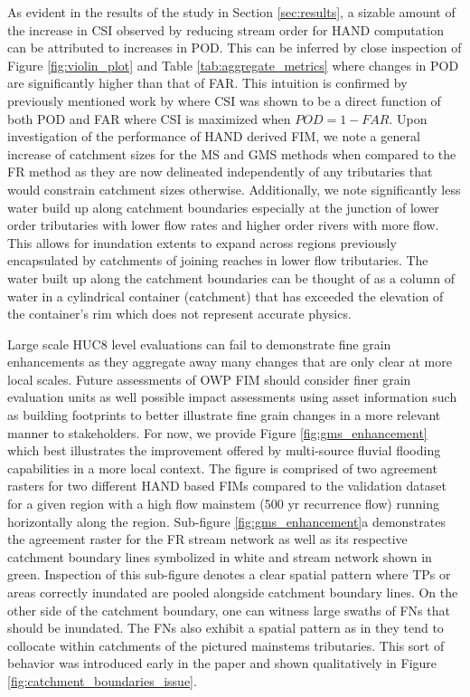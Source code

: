 \documentclass[draft]{dependencies/agujournal2019}
\begin{document}
As evident in the results of the study in Section \ref{sec:results}, a sizable amount of the increase in CSI observed by reducing stream order for HAND computation can be attributed to increases in POD.
This can be inferred by close inspection of Figure \ref{fig:violin_plot} and Table \ref{tab:aggregate_metrics} where changes in POD are significantly higher than that of FAR.
This intuition is confirmed by previously mentioned work by  where CSI was shown to be a direct function of both POD and FAR where CSI is maximized when $POD = 1 - FAR$.
Upon investigation of the performance of HAND derived FIM, we note a general increase of catchment sizes for the MS and GMS methods when compared to the FR method as they are now delineated independently of any tributaries that would constrain catchment sizes otherwise.
Additionally, we note significantly less water build up along catchment boundaries especially at the junction of lower order tributaries with lower flow rates and higher order rivers with more flow.
This allows for inundation extents to expand across regions previously encapsulated by catchments of joining reaches in lower flow tributaries.
The water built up along the catchment boundaries can be thought of as a column of water in a cylindrical container (catchment) that has exceeded the elevation of the container's rim which does not represent accurate physics.

Large scale HUC8 level evaluations can fail to demonstrate fine grain enhancements as they aggregate away many changes that are only clear at more local scales.
Future assessments of OWP FIM should consider finer grain evaluation units as well possible impact assessments using asset information such as building footprints to better illustrate fine grain changes in a more relevant manner to stakeholders.
For now, we provide Figure \ref{fig:gms_enhancement} which best illustrates the improvement offered by multi-source fluvial flooding capabilities in a more local context.
The figure is comprised of two agreement rasters for two different HAND based FIMs compared to the validation dataset for a given region with a high flow mainstem (500 yr recurrence flow) running horizontally along the region.
Sub-figure \ref{fig:gms_enhancement}a demonstrates the agreement raster for the FR stream network as well as its respective catchment boundary lines symbolized in white and stream network shown in green.
Inspection of this sub-figure denotes a clear spatial pattern where TPs or areas correctly inundated are pooled alongside catchment boundary lines. 
On the other side of the catchment boundary, one can witness large swaths of FNs that should be inundated. 
The FNs also exhibit a spatial pattern as in they tend to collocate within catchments of the pictured mainstems tributaries.
This sort of behavior was introduced early in the paper and shown qualitatively in Figure \ref{fig:catchment_boundaries_issue}.
\end{document}
